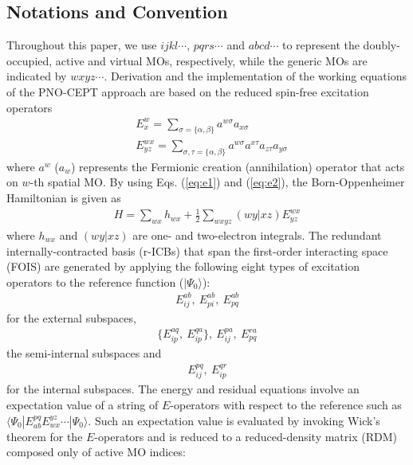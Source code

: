 \documentclass[aip,jcp,amsmath]{revtex4-1}
\begin{document}
\subsection{Notations and Convention}
%
Throughout this paper, we use $ijkl\cdots$, $pqrs\cdots$ and $abcd\cdots$ to represent the doubly-occupied, active and virtual MOs, respectively, while the generic MOs are indicated by $wxyz\cdots$.
%
Derivation and the implementation of the working equations of the PNO-CEPT approach are based on the reduced spin-free excitation operators\cite{PhysRevA.43.3392,PhysRevA.41.2391,doi:10.1063/1.448859,Kutzelnigg_Mukherjee1997}
%
\begin{align}
  &E^w_x = \sum_{\sigma=\{\alpha,\beta\}} a^{w\sigma}a_{x\sigma} \label{eq:e1} \\
  &E^{wx}_{yz} = \sum_{\sigma,\tau=\{\alpha,\beta\}} a^{w\sigma}a^{x\tau}a_{z\tau}a_{y\sigma} \label{eq:e2}
\end{align}
%
where $a^{w}$ ($a_w$) represents the Fermionic creation (annihilation) operator that acts on $w$-th spatial MO.
%
By using Eqs. (\ref{eq:e1}) and (\ref{eq:e2}), the Born-Oppenheimer Hamiltonian is given as
\begin{align}
  H=\sum_{wx} h_{wx} + \frac{1}{2}\sum_{wxyz} (wy|xz) E^{wx}_{yz}
\end{align}
%
where $h_{wx}$ and $(wy|xz)$ are one- and two-electron integrals.
%
The redundant internally-contracted basis (r-ICBs) that span the first-order interacting space (FOIS) are generated by applying the following eight types of excitation operators to the reference function ($|\Psi_0\rangle$):
%
\begin{align}
  E_{ij}^{ab},\ E_{pi}^{ab},\ E_{pq}^{ab} \label{eq:externalICB}
\end{align}
%
for the external subspaces,
%
\begin{align}
  \{E_{ip}^{aq},\ E_{ip}^{qa}\},\ E_{ij}^{pa},\ E_{pq}^{ra} \label{eq:semiinternalICB}
\end{align}
%
the semi-internal subspaces and
%
\begin{align}
  E_{ij}^{pq},\ E_{ip}^{qr} \label{eq:intternalICB}
\end{align}
%
for the internal subspaces.
%
The energy and residual equations involve an expectation value of a string of $E$-operators with respect to the reference such as $\langle\Psi_0|E^{pq}_{ab}E_{wx}^{yz}\cdots|\Psi_0\rangle$.
%
Such an expectation value is evaluated by invoking Wick's theorem for the $E$-operators and is reduced to a reduced-density matrix (RDM) composed only of active MO indices:
\end{document}
